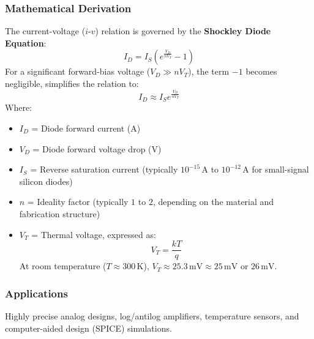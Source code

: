\documentclass[12pt,a3paper]{article}
\begin{document}
\begin{enumerate}
\begin{tcolorbox}[enhanced,breakable,ansbox,colback=cA!4,colframe=cA,boxrule=0.8pt,arc=5pt,title={\textbf{Answer}},fonttitle=\bfseries\color{white},colbacktitle=cA]
\subsubsection*{Mathematical Derivation}
The current-voltage ($i\text{-}v$) relation is governed by the \textbf{Shockley Diode Equation}:
\begin{equation}
    I_D = I_S \left( e^{\frac{V_D}{n V_T}} - 1 \right)
\end{equation}
For a significant forward-bias voltage ($V_D \gg n V_T$), the term $-1$ becomes negligible, simplifies the relation to:
\begin{equation}
    I_D \approx I_S e^{\frac{V_D}{n V_T}}
\end{equation}
Where:
\begin{itemize}
    \item $I_D$ = Diode forward current (A)
    \item $V_D$ = Diode forward voltage drop (V)
    \item $I_S$ = Reverse saturation current (typically $10^{-15}\,\text{A}$ to $10^{-12}\,\text{A}$ for small-signal silicon diodes)
    \item $n$ = Ideality factor (typically $1$ to $2$, depending on the material and fabrication structure)
    \item $V_T$ = Thermal voltage, expressed as:
    \begin{equation}
        V_T = \frac{k T}{q}
    \end{equation}
    At room temperature ($T \approx 300\,\text{K}$), $V_T \approx 25.3\,\text{mV} \approx 25\,\text{mV}$ or $26\,\text{mV}$.
\end{itemize}

\begin{center}
\end{center}

\subsubsection*{Applications}
Highly precise analog designs, log/antilog amplifiers, temperature sensors, and computer-aided design (SPICE) simulations.


\end{tcolorbox}
\end{enumerate}
\end{document}
